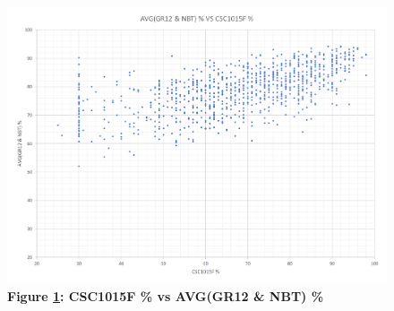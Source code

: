 \begin{figure}[H]
    \centering
    \includegraphics[scale=0.62]{./resources/figures/avg.png}
    \caption[CSC1015F \% vs AVG(GR12 \& NBT) \%]{\textbf{Figure \ref{fig-correlation-avg}: CSC1015F \% vs AVG(GR12 \& NBT) \%}}
    \label{fig-correlation-avg}
\end{figure}